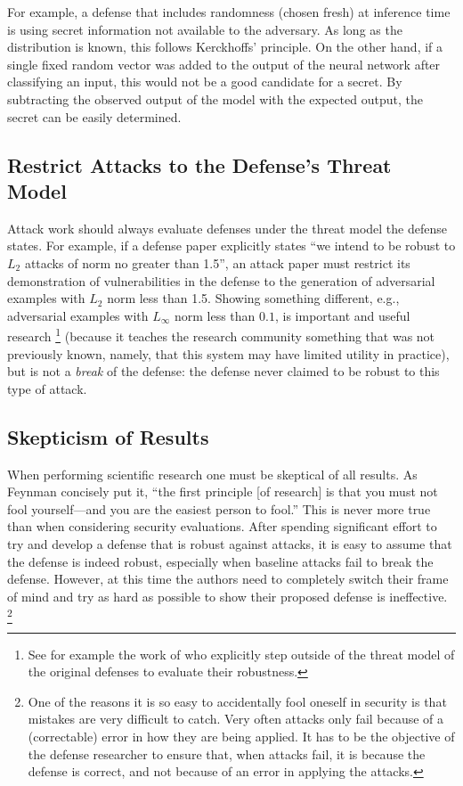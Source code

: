 \documentclass{article} %
\begin{document}
For example, a defense that includes randomness (chosen fresh) at inference
time is using secret information not available to the adversary.
%
As long as the distribution is known, this follows Kerckhoffs' principle.
%
On the other hand, if a single fixed random vector was added to the output
of the neural network after classifying an input, this would not be a good
candidate for a secret.
%
By subtracting the observed output of the model with
the expected output, the secret can be easily determined.


\subsection{Restrict Attacks to the Defense's Threat Model}
Attack work should always evaluate defenses under the
threat model the defense states.
%
For example, if a defense paper explicitly states
``we intend to be robust to $L_2$ attacks of norm no greater than
1.5'', an attack paper must restrict its demonstration of vulnerabilities
in the defense to the generation of adversarial
examples with $L_2$ norm less than 1.5. Showing something different,
e.g., adversarial examples with $L_\infty$ norm less than $0.1$,
is important and useful research%
\footnote{See for example the work of \cite{sharma2017breaking,song2018generative}
  who explicitly step outside of the threat model of the original defenses
  to evaluate their robustness.} (because it teaches the research community
something that was not previously known, namely, that this system may have
limited utility in practice), but is not a
\emph{break} of the defense: the defense never claimed to be robust to
this type of attack.


\subsection{Skepticism of Results}
When performing scientific research one must be skeptical of
all results.
%
As Feynman concisely put it, ``the first principle [of research] is that you
must not fool yourself---and you are the easiest person to fool.''
%
This is never more true than when considering security evaluations.
%
After spending significant effort to try and develop a defense
that is robust against attacks, it is easy to assume that the
defense is indeed robust, especially when baseline attacks
fail to break the defense.
%
However, at this time the authors need to completely switch
their frame of mind and try as hard as possible to show their
proposed defense is ineffective.%
\footnote{One of the reasons it is so easy to accidentally fool oneself in security
  is that mistakes are very difficult to catch. Very often attacks only fail
  because of a (correctable) error in how they are being applied. It has to be the
  objective of the defense researcher to ensure that, when attacks fail, it is
  because the defense is correct, and not because of an error in applying
  the attacks.}
\end{document}

